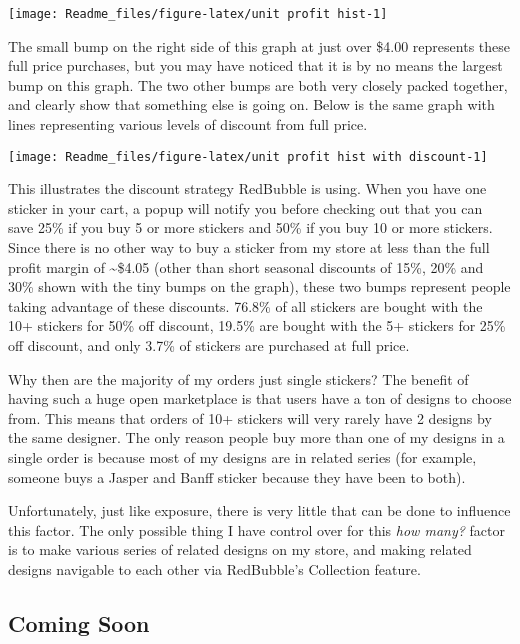 \documentclass[]{article}
\begin{document}
\begin{center}\texttt{[image: Readme\_files/figure-latex/unit profit hist-1]} \end{center}

The small bump on the right side of this graph at just over \$4.00
represents these full price purchases, but you may have noticed that it
is by no means the largest bump on this graph. The two other bumps are
both very closely packed together, and clearly show that something else
is going on. Below is the same graph with lines representing various
levels of discount from full price.

\begin{center}\texttt{[image: Readme\_files/figure-latex/unit profit hist with discount-1]} \end{center}

This illustrates the discount strategy RedBubble is using. When you have
one sticker in your cart, a popup will notify you before checking out
that you can save 25\% if you buy 5 or more stickers and 50\% if you buy
10 or more stickers. Since there is no other way to buy a sticker from
my store at less than the full profit margin of \textasciitilde{}\$4.05
(other than short seasonal discounts of 15\%, 20\% and 30\% shown with
the tiny bumps on the graph), these two bumps represent people taking
advantage of these discounts. 76.8\% of all stickers are bought with the
10+ stickers for 50\% off discount, 19.5\% are bought with the 5+
stickers for 25\% off discount, and only 3.7\% of stickers are purchased
at full price.

Why then are the majority of my orders just single stickers? The benefit
of having such a huge open marketplace is that users have a ton of
designs to choose from. This means that orders of 10+ stickers will very
rarely have 2 designs by the same designer. The only reason people buy
more than one of my designs in a single order is because most of my
designs are in related series (for example, someone buys a Jasper and
Banff sticker because they have been to both).

Unfortunately, just like exposure, there is very little that can be done
to influence this factor. The only possible thing I have control over
for this \emph{how many?} factor is to make various series of related
designs on my store, and making related designs navigable to each other
via RedBubble's Collection feature.

\subsection{Coming Soon}\label{coming-soon}
\end{document}
